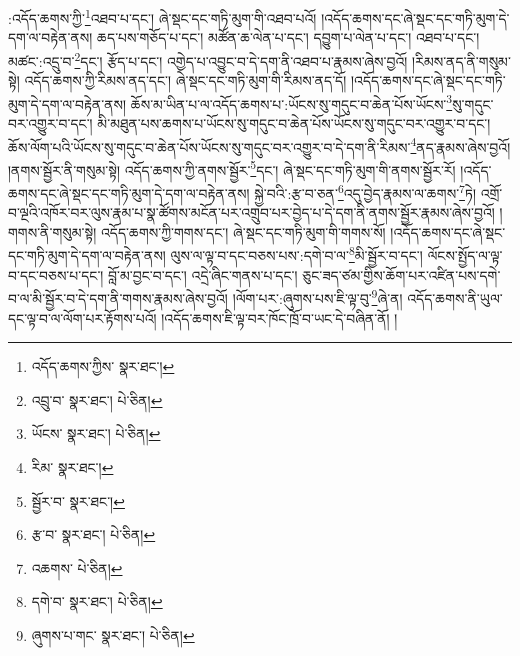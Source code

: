 :འདོད་ཆགས་ཀྱི་\footnote{འདོད་ཆགས་ཀྱིས་  སྣར་ཐང་། }འཐབ་པ་དང་། ཞེ་སྡང་དང་གཏི་མུག་གི་འཐབ་པའོ། །འདོད་ཆགས་དང་ཞེ་སྡང་དང་གཏི་མུག་དེ་དག་ལ་བརྟེན་ནས། ཆད་པས་གཅོད་པ་དང་། མཚོན་ཆ་ལེན་པ་དང་། དབྱུག་པ་ལེན་པ་དང་། འཐབ་པ་དང་། མཚང་:འདྲུ་བ་\footnote{འབྲུ་བ་  སྣར་ཐང་།  པེ་ཅིན། }དང་། རྩོད་པ་དང་། འགྱེད་པ་འབྱུང་བ་དེ་དག་ནི་འཐབ་པ་རྣམས་ཞེས་བྱའོ། །རིམས་ནད་ནི་གསུམ་སྟེ། འདོད་ཆགས་ཀྱི་རིམས་ནད་དང་། ཞེ་སྡང་དང་གཏི་མུག་གི་རིམས་ནད་དོ། །འདོད་ཆགས་དང་ཞེ་སྡང་དང་གཏི་མུག་དེ་དག་ལ་བརྟེན་ནས། ཆོས་མ་ཡིན་པ་ལ་འདོད་ཆགས་པ་:ཡོངས་སུ་གདུང་བ་ཆེན་པོས་ཡོངས་\footnote{ཡོངས་  སྣར་ཐང་།  པེ་ཅིན། }སུ་གདུང་བར་འགྱུར་བ་དང་། མི་མཐུན་པས་ཆགས་པ་ཡོངས་སུ་གདུང་བ་ཆེན་པོས་ཡོངས་སུ་གདུང་བར་འགྱུར་བ་དང་། ཆོས་ལོག་པའི་ཡོངས་སུ་གདུང་བ་ཆེན་པོས་ཡོངས་སུ་གདུང་བར་འགྱུར་བ་དེ་དག་ནི་རིམས་\footnote{རིམ་  སྣར་ཐང་། }ནད་རྣམས་ཞེས་བྱའོ། །ནགས་སྦྱོར་ནི་གསུམ་སྟེ། འདོད་ཆགས་ཀྱི་ནགས་སྦྱོར་\footnote{སྦྱོར་བ་  སྣར་ཐང་། }དང་། ཞེ་སྡང་དང་གཏི་མུག་གི་ནགས་སྦྱོར་རོ། །འདོད་ཆགས་དང་ཞེ་སྡང་དང་གཏི་མུག་དེ་དག་ལ་བརྟེན་ནས། སྐྱེ་བའི་:རྩ་བ་ཅན་\footnote{རྩ་བ་  སྣར་ཐང་།  པེ་ཅིན། }འདུ་བྱེད་རྣམས་ལ་ཆགས་\footnote{འཆགས་  པེ་ཅིན། }ཏེ། འགྲོ་བ་ལྔའི་འཁོར་བར་ལུས་རྣམ་པ་སྣ་ཚོགས་མངོན་པར་འགྲུབ་པར་བྱེད་པ་དེ་དག་ནི་ནགས་སྦྱོར་རྣམས་ཞེས་བྱའོ། །གགས་ནི་གསུམ་སྟེ། འདོད་ཆགས་ཀྱི་གགས་དང་། ཞེ་སྡང་དང་གཏི་མུག་གི་གགས་སོ། །འདོད་ཆགས་དང་ཞེ་སྡང་དང་གཏི་མུག་དེ་དག་ལ་བརྟེན་ནས། ལུས་ལ་ལྟ་བ་དང་བཅས་པས་:དགེ་བ་ལ་\footnote{དགེ་བ་  སྣར་ཐང་།  པེ་ཅིན། }མི་སྦྱོར་བ་དང་། ལོངས་སྤྱོད་ལ་ལྟ་བ་དང་བཅས་པ་དང་། བློ་མ་བྱང་བ་དང་། འདྲེ་ཞིང་གནས་པ་དང་། ཅུང་ཟད་ཙམ་གྱིས་ཆོག་པར་འཛིན་པས་དགེ་བ་ལ་མི་སྦྱོར་བ་དེ་དག་ནི་གགས་རྣམས་ཞེས་བྱའོ། །ལོག་པར་:ཞུགས་པས་ཇི་ལྟ་བུ་\footnote{ཞུགས་པ་གང་  སྣར་ཐང་།  པེ་ཅིན། }ཞེ་ན། འདོད་ཆགས་ནི་ཡུལ་དང་ལྟ་བ་ལ་ལོག་པར་རྟོགས་པའོ། །འདོད་ཆགས་ཇི་ལྟ་བར་ཁོང་ཁྲོ་བ་ཡང་དེ་བཞིན་ནོ། །
